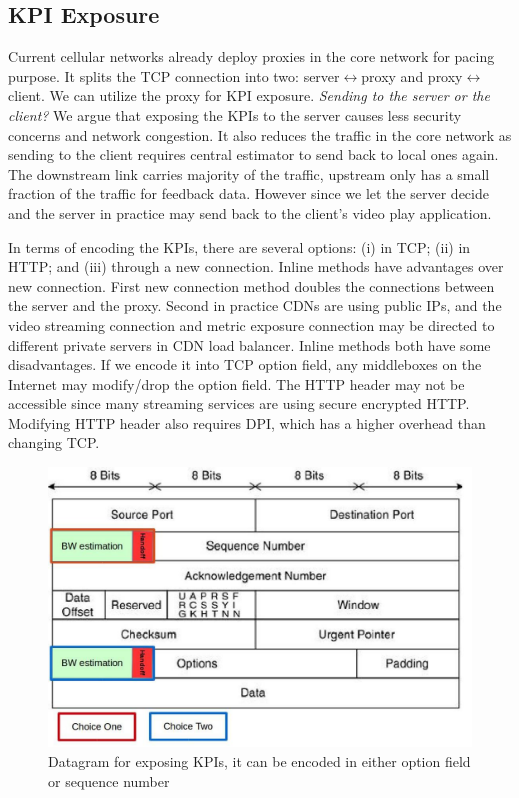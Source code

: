 \subsection{KPI Exposure}\label{subsec:exposingAPI}
Current cellular networks already deploy proxies in the core network for
pacing purpose\cite{UntoldMiddleBoxStory}. It splits the TCP connection into two: server$\leftrightarrow
$proxy and proxy$\leftrightarrow $client. We can utilize the proxy for KPI
exposure. \emph{Sending to the server or the client?} We argue that exposing the
KPIs to the server causes less security concerns and network congestion. It also reduces the traffic in
the core network as sending to the client requires central estimator to send
back to local ones again. The downstream link carries majority of the traffic, upstream only has a small fraction of the traffic for feedback data. 
However since we let the server decide and the server in practice
may send back to the client's video play application. 

In terms of encoding the KPIs, there are several options: (i) in TCP; (ii) in
HTTP; and (iii) through a new connection. Inline methods have advantages over
new connection. First new connection method doubles the connections between the
server and the proxy. Second in practice CDNs are using public IPs, and the
video streaming connection and metric exposure connection may be directed to different private servers in CDN
load balancer. Inline methods both have some disadvantages. 
If we encode it into TCP option field, any middleboxes on the Internet may modify/drop the option field. 
The HTTP header may not be accessible since many streaming
services are using secure encrypted HTTP. Modifying HTTP header also requires DPI, which has a higher overhead than changing TCP.
\begin{figure}[t]\label{fig:Datagram}
 \includegraphics[width=\linewidth]{pictures/datagram.pdf}
 \caption{Datagram for exposing KPIs, it can be encoded in either option field or sequence number}
\end{figure}

